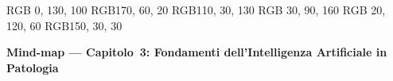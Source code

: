

\definecolor{cTax} {RGB}{  0, 130, 100}   %
\definecolor{cSym} {RGB}{170,  60,  20}   %
\definecolor{cML}  {RGB}{110,  30, 130}   %
\definecolor{cBay} {RGB}{ 30,  90, 160}   %
\definecolor{cDL}  {RGB}{ 20, 120,  60}   %
\definecolor{cTLB} {RGB}{150,  30,  30}   %


\begin{center}
  {\large\bfseries Mind-map ---
   Capitolo~3: Fondamenti dell'Intelligenza Artificiale in Patologia}
\end{center}

\vspace{-2pt}

